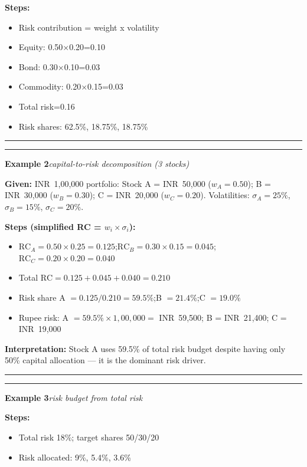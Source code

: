 \documentclass[
]{article}
\begin{document}
\noindent\textbf{Steps:}
\begin{itemize}\setlength{\itemsep}{3pt}
  \item Risk contribution = weight x volatility
  \item Equity: 0.50$\times$0.20=0.10
  \item Bond: 0.30$\times$0.10=0.03
  \item Commodity: 0.20$\times$0.15=0.03
  \item Total risk=0.16
  \item Risk shares: 62.5\%, 18.75\%, 18.75\%
\end{itemize}

\noindent\rule{\linewidth}{0.4pt}
\medskip
\noindent\rule{\linewidth}{0.4pt}
\noindent\textbf{Example 2}\enspace\textit{capital-to-risk decomposition (3 stocks)}

\noindent\textbf{Given:} INR~1,00,000 portfolio: Stock A = INR~50,000 ($w_A=0.50$); B = INR~30,000 ($w_B=0.30$); C = INR~20,000 ($w_C=0.20$). Volatilities: $\sigma_A=25\%$, $\sigma_B=15\%$, $\sigma_C=20\%$.

\noindent\textbf{Steps (simplified RC = $w_i\times\sigma_i$):}
\begin{itemize}\setlength{\itemsep}{3pt}
  \item $\text{RC}_A = 0.50\times0.25 = 0.125$;\quad $\text{RC}_B = 0.30\times0.15 = 0.045$;\quad $\text{RC}_C = 0.20\times0.20 = 0.040$
  \item Total $\text{RC} = 0.125+0.045+0.040 = 0.210$
  \item Risk share A $= 0.125/0.210 = 59.5\%$;\quad B $= 21.4\%$;\quad C $= 19.0\%$
  \item Rupee risk: A $= 59.5\%\times1{,}00{,}000 =$ INR~59,500; B = INR~21,400; C = INR~19,000
\end{itemize}

\noindent\textbf{Interpretation:} Stock A uses 59.5\% of total risk budget despite having only 50\% capital allocation --- it is the dominant risk driver.

\noindent\rule{\linewidth}{0.4pt}
\medskip
\noindent\rule{\linewidth}{0.4pt}
\noindent\textbf{Example 3}\enspace\textit{risk budget from total risk}

\noindent\textbf{Steps:}
\begin{itemize}\setlength{\itemsep}{3pt}
  \item Total risk 18\%; target shares 50/30/20
  \item Risk allocated: 9\%, 5.4\%, 3.6\%
\end{itemize}
\end{document}
